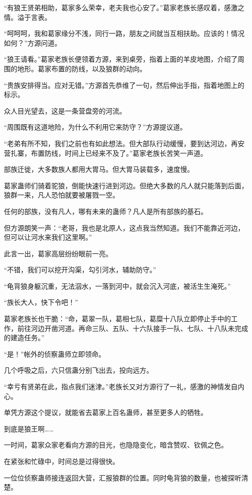 \begin{this_body}
“有狼王贤弟相助，葛家多么荣幸，老夫我也心安了。”葛家老族长感叹着，感激之情。溢于言表。

“呵呵呵，我和葛家缘分不浅，同行一路，朋友之间就当互相扶助。应该的！情况如何？”方源问道。

“狼王请看。”葛家老族长便领着方源，来到桌旁，指着上面的羊皮地图，介绍了周围的地形。葛家布置的防线，以及狼群的动向。

“贵族安排得当。应对无错。”方源首先恭维了一句，然后伸出手指，指着地图上的标示。

众人目光望去，这是一条营盘旁的河流。

“周围既有这道地险，为什么不利用它来防守？”方源提议道。

“老弟有所不知，我们之前也有如此想法。但大部队行动缓慢，要到达河边，再安营扎寨，布置防线，时间上已经来不及了。”葛家老族长苦笑一声道。

部族迁徙，大多数族人都用大胃马。但大胃马装载多，速度慢。

葛家蛊师们骑着驼狼，倒能快速行进到河边。但绝大多数的凡人就只能落到后面，狼群一来，凡人恐怕就要被屠戮一空。

任何的部族，没有凡人，哪有未来的蛊师？凡人是所有部族的基石。

但方源朗笑一声：“老哥，我也是北原人，这点我当然知道。我们不能靠近河边，但可以让河水来我们这里啊。”

此言一出，葛家高层纷纷眼前一亮。

“不错，我们可以挖开沟渠，勾引河水，辅助防守。”

“龟背狼身躯沉重，无法泅水，一落到河中，就会沉入河底，被活生生淹死。”

“族长大人，快下令吧！”

葛家老族长也干脆：“命，葛翠一队，葛相七队，葛糜十八队立即停止手中的工作，前往河边开凿河道。再命三队、五队、十六队接手一队、七队、十八队未完成的建造任务。”

“是！”帐外的侦察蛊师立即领命。

几个呼吸之后，六只信蛊分别飞出去，投向远方。

“幸亏有贤弟在此，指点我们迷津。”老族长又对方源行了一礼，感激的神情发自内心。

单凭方源这个提议，就能省去葛家上百名蛊师，甚至更多人的牺牲。

到底是狼王啊……

一时间，葛家众家老看向方源的目光，也隐隐变化，暗含赞叹、钦佩之色。

在紧张和忙碌中，时间总是过得很快。

一位位侦察蛊师接连返回大营，汇报狼群的位置。同时龟背狼的数量，也被探听清楚。


\end{this_body}
